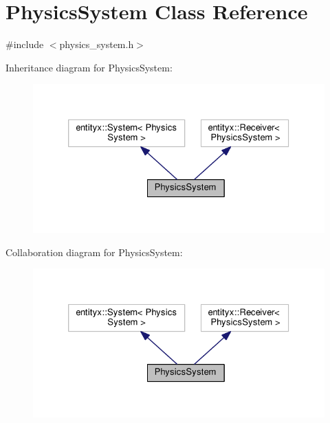 \hypertarget{classPhysicsSystem}{}\section{Physics\+System Class Reference}
\label{classPhysicsSystem}


{\ttfamily \#include $<$physics\+\_\+system.\+h$>$}



Inheritance diagram for Physics\+System\+:
\nopagebreak
\begin{figure}[H]
\begin{center}
\leavevmode
\includegraphics[width=326pt]{classPhysicsSystem__inherit__graph}
\end{center}
\end{figure}


Collaboration diagram for Physics\+System\+:
\nopagebreak
\begin{figure}[H]
\begin{center}
\leavevmode
\includegraphics[width=326pt]{classPhysicsSystem__coll__graph}
\end{center}
\end{figure}
